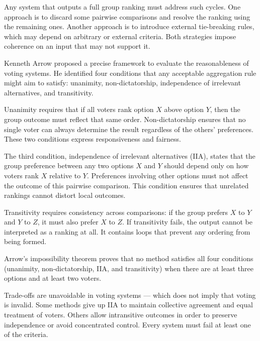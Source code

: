 Any system that outputs a full group ranking must address such cycles. One approach is to discard some pairwise comparisons and resolve the ranking using the remaining ones. Another approach is to introduce external tie-breaking rules, which may depend on arbitrary or external criteria. Both strategies impose coherence on an input that may not support it.

Kenneth Arrow proposed a precise framework to evaluate the reasonableness of voting systems. He identified four conditions that any acceptable aggregation rule might aim to satisfy: unanimity, non-dictatorship, independence of irrelevant alternatives, and transitivity.

Unanimity requires that if all voters rank option $X$ above option $Y$, then the group outcome must reflect that same order. Non-dictatorship ensures that no single voter can always determine the result regardless of the others' preferences. These two conditions express responsiveness and fairness.

The third condition, independence of irrelevant alternatives (IIA), states that the group preference between any two options $X$ and $Y$ should depend only on how voters rank $X$ relative to $Y$. Preferences involving other options must not affect the outcome of this pairwise comparison. This condition ensures that unrelated rankings cannot distort local outcomes.

Transitivity requires consistency across comparisons: if the group prefers $X$ to $Y$ and $Y$ to $Z$, it must also prefer $X$ to $Z$. If transitivity fails, the output cannot be interpreted as a ranking at all. It contains loops that prevent any ordering from being formed.

Arrow’s impossibility theorem proves that no method satisfies all four conditions (unanimity, non-dictatorship, IIA, and transitivity) when there are at least three options and at least two voters. 

Trade-offs are unavoidable in voting systems — which does not imply that voting is invalid. Some methods give up IIA to maintain collective agreement and equal treatment of voters. Others allow intransitive outcomes in order to preserve independence or avoid concentrated control. Every system must fail at least one of the criteria.

